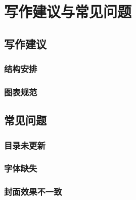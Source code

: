 \chapter{写作建议与常见问题}

\section{写作建议}
\placeholderpar

\subsection{结构安排}
\placeholderpar

\subsection{图表规范}
\placeholderpar

\section{常见问题}
\placeholderpar

\subsection{目录未更新}
\placeholderpar

\subsection{字体缺失}
\placeholderpar

\subsection{封面效果不一致}
\placeholderpar
